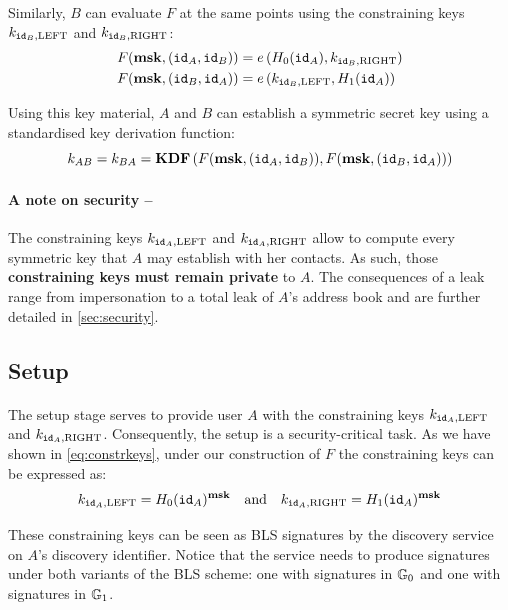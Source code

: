 	\noindent Similarly, $B$ can evaluate $F$ at the same points using the constraining keys $k_{\mathtt{id}_B,\mathrm{LEFT}}$ and $k_{\mathtt{id}_B,\mathrm{RIGHT}}$:		
		\begin{align}
			F(\mathbf{msk}, (\mathtt{id}_A, \mathtt{id}_B)) &= e\left(H_0(\mathtt{id}_A), k_{\mathtt{id}_B,\mathrm{RIGHT}} \right) \\
			F(\mathbf{msk}, (\mathtt{id}_B, \mathtt{id}_A)) &= e\left(k_{\mathtt{id}_B,\mathrm{LEFT}}, H_1(\mathtt{id}_A) \right) 
		\end{align}
	
\noindent Using this key material, $A$ and $B$ can establish a symmetric secret key using a standardised key derivation function:
	\begin{equation}
		k_{AB} = k_{BA} = \mathbf{KDF}\left(F(\mathbf{msk}, (\mathtt{id}_A, \mathtt{id}_B)), F(\mathbf{msk}, (\mathtt{id}_B, \mathtt{id}_A))\right)
	\end{equation}
	
	\paragraph{A note on security --} The constraining keys $k_{\mathtt{id}_A,\mathrm{LEFT}}$ and $k_{\mathtt{id}_A,\mathrm{RIGHT}}$ allow to compute every symmetric key that $A$ may establish with her contacts. As such, those \textbf{constraining keys must remain private} to $A$. The consequences of a leak range from impersonation to a total leak of $A$'s address book and are further detailed in \autoref{sec:security}.
	
	\subsection{Setup}
	\label{sec:setup}
		
		\paragraph{}  The setup stage serves to provide user $A$ with the constraining keys $k_{\mathtt{id}_A,\mathrm{LEFT}}$ and $k_{\mathtt{id}_A,\mathrm{RIGHT}}$. Consequently, the setup is a security-critical task. As we have shown in \autoref{eq:constrkeys}, under our construction of $F$ the constraining keys can be expressed as:
		\begin{equation}
			k_{\mathtt{id}_A,\mathrm{LEFT}} = H_0(\mathtt{id}_A)^{\mathbf{msk}} \quad \mathrm{and} \quad k_{\mathtt{id}_A,\mathrm{RIGHT}} = H_1(\mathtt{id}_A)^{\mathbf{msk}}
		\end{equation}
		
		\noindent These constraining keys can be seen as BLS signatures by the discovery service on $A$'s discovery identifier. Notice that the service needs to produce signatures under both variants of the BLS scheme: one with signatures in $\mathbb{G}_0$ and one with signatures in $\mathbb{G}_1$.
	
